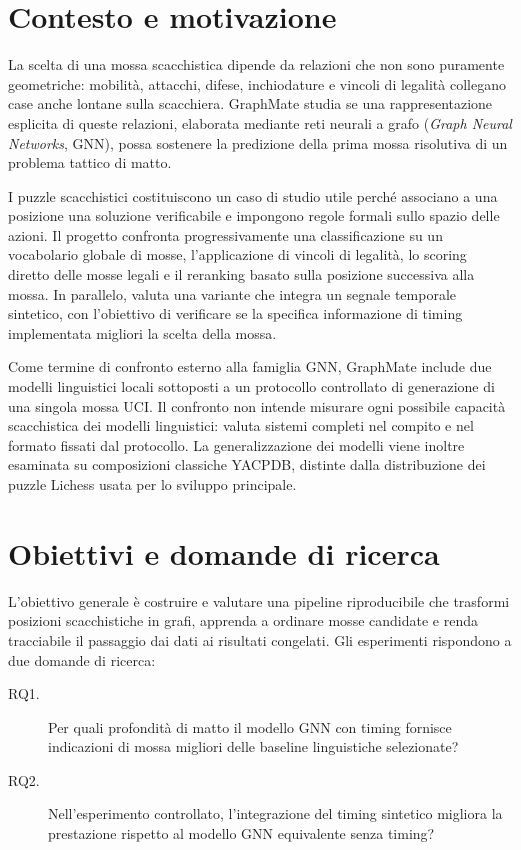 \label{chap:introduction}

\section{Contesto e motivazione}

La scelta di una mossa scacchistica dipende da relazioni che non sono puramente
geometriche: mobilità, attacchi, difese, inchiodature e vincoli di legalità
collegano case anche lontane sulla scacchiera. GraphMate studia se una
rappresentazione esplicita di queste relazioni, elaborata mediante reti neurali a
grafo (\textit{Graph Neural Networks}, GNN), possa sostenere la predizione della
prima mossa risolutiva di un problema tattico di matto.

I puzzle scacchistici costituiscono un caso di studio utile perché associano a una
posizione una soluzione verificabile e impongono regole formali sullo spazio delle
azioni. Il progetto confronta progressivamente una classificazione su un
vocabolario globale di mosse, l'applicazione di vincoli di legalità, lo scoring
diretto delle mosse legali e il reranking basato sulla posizione successiva alla
mossa. In parallelo, valuta una variante che integra un segnale temporale
sintetico, con l'obiettivo di verificare se la specifica informazione di timing
implementata migliori la scelta della mossa.

Come termine di confronto esterno alla famiglia GNN, GraphMate include due modelli
linguistici locali sottoposti a un protocollo controllato di generazione di una
singola mossa UCI. Il confronto non intende misurare ogni possibile capacità
scacchistica dei modelli linguistici: valuta sistemi completi nel compito e nel
formato fissati dal protocollo. La generalizzazione dei modelli viene inoltre
esaminata su composizioni classiche YACPDB, distinte dalla distribuzione dei puzzle
Lichess usata per lo sviluppo principale.

\section{Obiettivi e domande di ricerca}

L'obiettivo generale è costruire e valutare una pipeline riproducibile che trasformi
posizioni scacchistiche in grafi, apprenda a ordinare mosse candidate e renda
tracciabile il passaggio dai dati ai risultati congelati. Gli esperimenti rispondono
a due domande di ricerca:

\begin{description}
    \item[RQ1.] Per quali profondità di matto il modello GNN con timing fornisce
    indicazioni di mossa migliori delle baseline linguistiche selezionate?
    \item[RQ2.] Nell'esperimento controllato, l'integrazione del timing sintetico
    migliora la prestazione rispetto al modello GNN equivalente senza timing?
\end{description}

